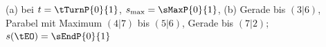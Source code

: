 (a) bei $t = \tTurnP{0}{1}$, $s_\mathrm{max} = \sMaxP{0}{1}$, (b) Gerade bis $(3|6)$, Parabel mit Maximum $(4|7)$ bis $(5|6)$, Gerade bis $(7|2)$; $s(\tEO) = \sEndP{0}{1}$

